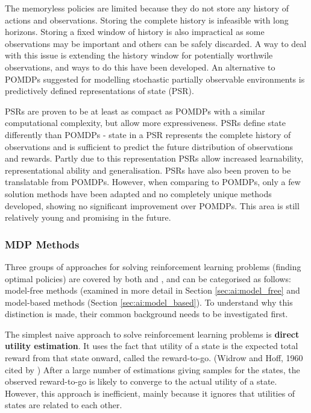 The memoryless policies are limited because they do not store any history of
actions and observations. Storing the complete history is infeasible with long
horizons. Storing a fixed window of history is also impractical as some
observations may be important and others can be safely discarded. A way to deal
with this issue is extending the history window for potentially worthwile
observations, and ways to do this have been developed. An alternative to POMDPs
suggested for modelling stochastic partially observable environments is
predictively defined representations of state (PSR).
\parencite{Spaan2012ai+pomdp}

PSRs are proven to be at least as compact as POMDPs with a similar
computational complexity, but allow more expressiveness. PSRs define state
differently than POMDPs - state in a PSR represents the complete history of
observations and is sufficient to predict the future distribution of
observations and rewards. Partly due to this representation PSRs allow
increased learnability, representational ability and generalisation. PSRs have
also been proven to be translatable from POMDPs. However, when comparing to
POMDPs, only a few solution methods have been adapted and no completely unique
methods developed, showing no significant improvement over POMDPs. This area is
still relatively young and promising in the future.
\parencite{Wingate2012ai+psr}


\subsubsection{MDP Methods}

Three groups of approaches for solving reinforcement learning problems (finding
optimal policies) are covered by both \textcite{Russell2010ai+modern} and
\textcite{Sutton1998ai+reinforcement}, and can be categorised as follows:
model-free methods (examined in more detail in Section \ref{sec:ai:model_free}
and model-based methods (Section \ref{sec:ai:model_based}). To understand why
this distinction is made, their common background needs to be investigated
first.

The simplest naive approach to solve reinforcement learning problems is
\textbf{direct utility estimation}. It uses the fact that utility of a state is
the expected total reward from that state onward, called the reward-to-go.
(Widrow and Hoff, 1960 cited by \textcite{Russell2010ai+modern}) After a large
number of estimations giving samples for the states, the observed reward-to-go
is likely to converge to the actual utility of a state. However, this approach
is inefficient, mainly because it ignores that utilities of states are related
to each other. \parencite{Russell2010ai+modern}

